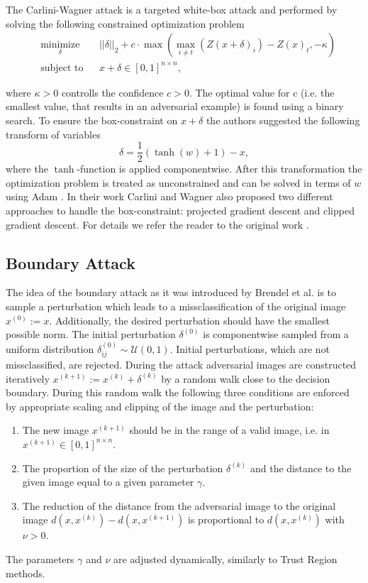 \documentclass{article}
\begin{document}
The Carlini-Wagner attack \cite{carlini} is a targeted white-box attack and performed by solving the following constrained optimization problem
\begin{equation}
	\begin{aligned}
	& \underset{\delta}{\text{minimize}}
	& & ||\delta||_2 + c \cdot \max(\max_{i\neq t}(Z(x+\delta)_i)-Z(x)_t, -\kappa) \\
	& \text{subject to}
	& & x+\delta \in [0,1]^{n \times n},
	\end{aligned}
\end{equation}

where $\kappa > 0$ controlls the confidence $c>0$. The optimal value for c (i.e. the smallest value, that results in an adversarial example) is found using a binary search. To ensure the box-constraint on $x+\delta$ the authors suggested the following transform of variables 
\begin{equation}
	\delta = \frac{1}{2}(\tanh(w)+1)-x,
\end{equation} 
where the $\tanh$-function is applied componentwise. After this transformation the optimization problem is treated as unconstrained and can be solved in terms of $w$ using Adam \cite{adam}. In their work Carlini and Wagner also proposed two different approaches to handle the box-constraint: projected gradient descent and clipped gradient descent. For details we refer the reader to the original work \cite{carlini}.

\subsection{Boundary Attack}

The idea of the boundary attack as it was introduced by Brendel et al. \cite{boundary} is to sample a perturbation which leads to a missclassification of the original image $x^{(0)}:=x$. Additionally, the desired perturbation should have the smallest possible norm. The initial perturbation $\delta^{(0)}$ is componentwise sampled from a uniform distribution $\delta^{(0)}_{ij}\sim \mathcal{U}(0,1)$. Initial perturbations, which are not missclassified, are rejected. During the attack adversarial images are constructed iteratively $x^{(k+1)}:= x^{(k)}+\delta^{(k)}$ by a random walk close to the decision boundary. During this random walk the following three conditions are enforced by appropriate scaling and clipping of the image and the perturbation:
\begin{enumerate}
	\item The new image $x^{(k+1)}$ should be in the range of a valid image, i.e. in $x^{(k+1)}\in [0,1]^{n\times n}$.
	\item The proportion of the size of the perturbation $\delta^{(k)}$ and the distance to the given image equal to a given parameter $\gamma$.
	\item The reduction of the distance from the adversarial image to the original image $d(x, x^{(k)})-d(x, x^{(k+1)})$ is proportional to $d(x, x^{(k)})$ with $\nu>0$.
\end{enumerate}
The parameters $\gamma$ and $\nu$ are adjusted dynamically, similarly to Trust Region methods.
\end{document}
